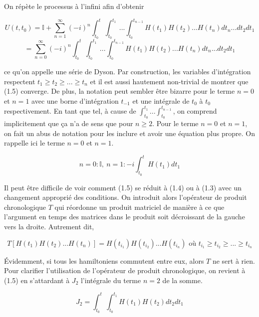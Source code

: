 On répète le processus à l'infini afin d'obtenir

\begin{equation*}
    U(t,t_0) = \mathbb{I} + \sum_{n=1}^{\infty}(-i)^n \int_{t_0}^{t}\int_{t_0}^{t_1} \ ... \int_{t_0}^{t_{n-1}}H(t_1)H(t_2) ... H(t_n)dt_n ... dt_2 dt_1 
\end{equation*}
\begin{equation}
    = \sum_{n=0}^{\infty}(-i)^n \int_{t_0}^{t}\int_{t_0}^{t_1} \ ... \int_{t_0}^{t_{n-1}}H(t_1)H(t_2) ... H(t_n)dt_n ... dt_2 dt_1  
\end{equation}

ce qu'on appelle une série de Dyson. Par construction, les variables d'intégration respectent $t_1 \geq t_2 \geq ... \geq t_n$ et il est aussi hautement non-trivial de montrer que (1.5) converge. De plus, la notation peut sembler être bizarre pour le terme $n=0$ et $n=1$ avec une borne d'intégration $t_{-1}$ et une intégrale de $t_0$ à $t_0$ respectivement. En tant que tel, à cause de $\int_{t_0}^{t_1} ... \int_{t_0}^{t_{n-1}}$, on comprend implicitement que ça n'a de sens que pour $n\geq2$. Pour le terme $n=0$ et $n=1$, on fait un abus de notation pour les inclure et avoir une équation plus propre. On rappelle ici le terme $n=0$ et $n=1$.

\begin{equation*}
    n=0 : \mathbb{I}, \ n=1 : -i\int_{t_0}^{t}H(t_1)dt_1
\end{equation*}

Il peut être difficile de voir comment (1.5) se réduit à (1.4) ou à (1.3) avec un changement approprié des conditions. On introduit alors l'opérateur de produit chronologique $T$ qui réordonne un produit matriciel de manière à ce que l'argument en temps des matrices dans le produit soit décroissant de la gauche vers la droite. Autrement dit,

\begin{equation}
    T[H(t_1)H(t_2)...H(t_n)] = H(t_{i_1})H(t_{i_2})...H(t_{i_n}) \text{ où } t_{i_1} \geq t_{i_2} \geq ... \geq t_{i_n}
\end{equation}

Évidemment, si tous les hamiltoniens commutent entre eux, alors $T$ ne sert à rien. Pour clarifier l'utilisation de l'opérateur de produit chronologique, on revient à (1.5) en s'attardant à $J_2$ l'intégrale du terme $n=2$ de la somme.

\begin{equation*}
    J_2 = \int_{t_0}^{t}\int_{t_0}^{t_1}H(t_1)H(t_2)dt_2dt_1 
\end{equation*}

